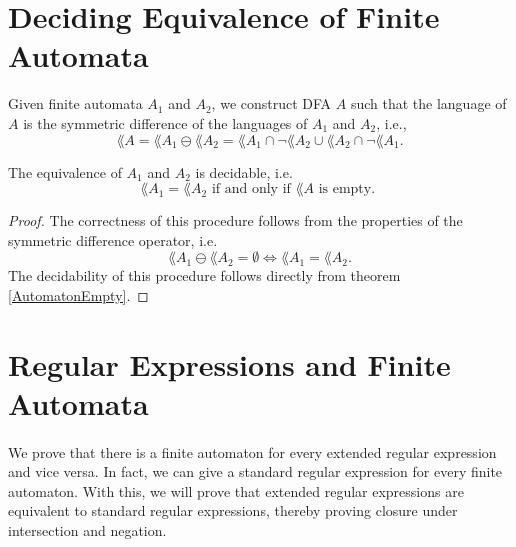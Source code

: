             \section{Deciding Equivalence of Finite Automata}
            Given finite automata $A_1$ and $A_2$, we construct DFA $A$ such that the language of $A$ is the symmetric difference of the languages of $A_1$ and $A_2$, i.e.,
            \begin{equation*}          
                \lang{A} = \lang{A_1} \ominus \lang{A_2} = \lang{A_1} \cap \neg \lang{A_2} \cup \lang{A_2} \cap \neg \lang{A_1}.      
            \end{equation*}
                \begin{theorem} The equivalence of $A_1$ and $A_2$ is decidable, i.e.
                    \begin{equation*}                \lang{A_1} = \lang{A_2} \mbox{ if and only if } \lang{A} \mbox{ is empty. }                \end{equation*}
                    \end{theorem}
                    \begin{proof}
                        The correctness of this procedure follows from the properties of the symmetric difference operator, i.e.
                        \begin{equation*}                  \lang{A_1} \ominus \lang{A_2} = \emptyset \Leftrightarrow \lang{A_1} = \lang{A_2}.                  \end{equation*}
                            The decidability of this procedure follows directly from theorem \ref{AutomatonEmpty}.
                        \end{proof}


                        \section{Regular Expressions and Finite Automata}

                        \paragraph{} 
                        We prove that there is a finite automaton for every extended regular expression and vice versa. 
                        In fact, we can give a standard regular expression for every finite automaton.
                        With this, we will prove that extended regular expressions are equivalent to standard regular expressions, 
                        thereby proving closure under intersection and negation.


